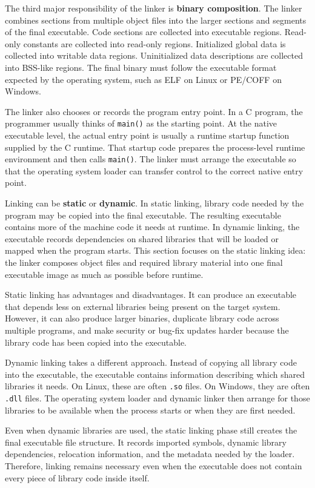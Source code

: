 The third major responsibility of the linker is \textbf{binary composition}. The linker combines sections from multiple object files into the larger sections and segments of the final executable. Code sections are collected into executable regions. Read-only constants are collected into read-only regions. Initialized global data is collected into writable data regions. Uninitialized data descriptions are collected into BSS-like regions. The final binary must follow the executable format expected by the operating system, such as ELF on Linux or PE/COFF on Windows.

The linker also chooses or records the program entry point. In a C program, the programmer usually thinks of \texttt{main()} as the starting point. At the native executable level, the actual entry point is usually a runtime startup function supplied by the C runtime. That startup code prepares the process-level runtime environment and then calls \texttt{main()}. The linker must arrange the executable so that the operating system loader can transfer control to the correct native entry point.

Linking can be \textbf{static} or \textbf{dynamic}. In static linking, library code needed by the program may be copied into the final executable. The resulting executable contains more of the machine code it needs at runtime. In dynamic linking, the executable records dependencies on shared libraries that will be loaded or mapped when the program starts. This section focuses on the static linking idea: the linker composes object files and required library material into one final executable image as much as possible before runtime.

Static linking has advantages and disadvantages. It can produce an executable that depends less on external libraries being present on the target system. However, it can also produce larger binaries, duplicate library code across multiple programs, and make security or bug-fix updates harder because the library code has been copied into the executable.

Dynamic linking takes a different approach. Instead of copying all library code into the executable, the executable contains information describing which shared libraries it needs. On Linux, these are often \texttt{.so} files. On Windows, they are often \texttt{.dll} files. The operating system loader and dynamic linker then arrange for those libraries to be available when the process starts or when they are first needed.

Even when dynamic libraries are used, the static linking phase still creates the final executable file structure. It records imported symbols, dynamic library dependencies, relocation information, and the metadata needed by the loader. Therefore, linking remains necessary even when the executable does not contain every piece of library code inside itself.

